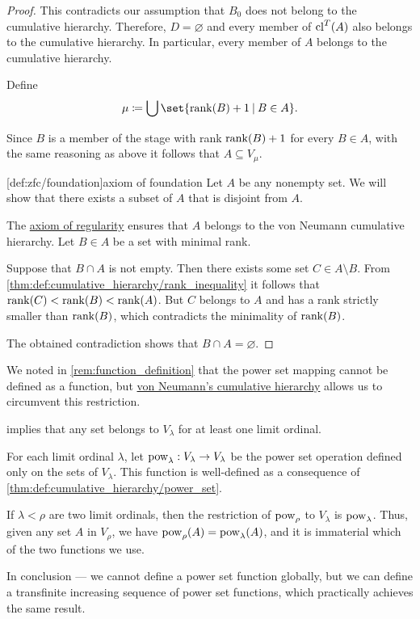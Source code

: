 \begin{proof}
  This contradicts our assumption that \( B_0 \) does not belong to the cumulative hierarchy. Therefore, \( D = \varnothing \) and every member of \( \operatorname{cl}^T(A) \) also belongs to the cumulative hierarchy. In particular, every member of \( A \) belongs to the cumulative hierarchy.

  Define
  \begin{equation*}
    \mu \coloneqq \bigcup\set{ \rank(B) + 1 \given B \in A }.
  \end{equation*}

  Since \( B \) is a member of the stage with rank \( \operatorname{rank}(B) + 1 \) for every \( B \in A \), with the same reasoning as above it follows that \( A \subseteq V_\mu \).

  [def:zfc/foundation]{axiom of foundation} Let \( A \) be any nonempty set. We will show that there exists a subset of \( A \) that is disjoint from \( A \).

  The \hyperref[thm:axiom_of_regularity]{axiom of regularity} ensures that \( A \) belongs to the von Neumann cumulative hierarchy. Let \( B \in A \) be a set with minimal rank.

  Suppose that \( B \cap A \) is not empty. Then there exists some set \( C \in A \setminus B \). From \cref{thm:def:cumulative_hierarchy/rank_inequality} it follows that \( \operatorname{rank}(C) < \operatorname{rank}(B) < \operatorname{rank}(A) \). But \( C \) belongs to \( A \) and has a rank strictly smaller than \( \operatorname{rank}(B) \), which contradicts the minimality of \( \operatorname{rank}(B) \).

  The obtained contradiction shows that \( B \cap A = \varnothing \).
\end{proof}

\begin{remark}\label{rem:pow_in_cumulative_hierarchy}
  We noted in \cref{rem:function_definition} that the power set mapping cannot be defined as a function, but \hyperref[def:cumulative_hierarchy]{von Neumann's cumulative hierarchy} allows us to circumvent this restriction.

   implies that any set belongs to \( V_\lambda \) for at least one limit ordinal.

  For each limit ordinal \( \lambda \), let \( \operatorname{pow}_\lambda: V_\lambda \to V_\lambda \) be the power set operation defined only on the sets of \( V_\lambda \). This function is well-defined as a consequence of \cref{thm:def:cumulative_hierarchy/power_set}.

  If \( \lambda < \rho \) are two limit ordinals, then the restriction of \( \operatorname{pow}_\rho \) to \( V_\lambda \) is \( \operatorname{pow}_\lambda \). Thus, given any set \( A \) in \( V_\rho \), we have \( \operatorname{pow}_\rho(A) = \operatorname{pow}_\lambda(A) \), and it is immaterial which of the two functions we use.

  In conclusion --- we cannot define a power set function globally, but we can define a transfinite increasing sequence of power set functions, which practically achieves the same result.
\end{remark}

